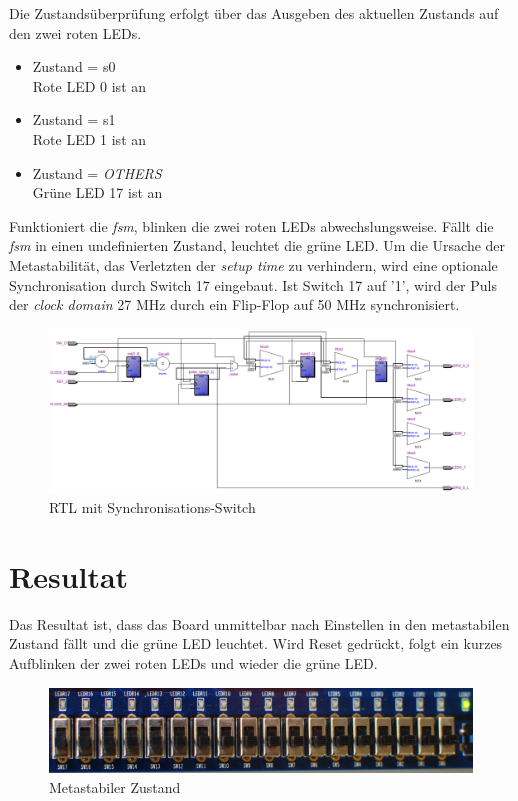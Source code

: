 Die Zustandsüberprüfung erfolgt über das Ausgeben des aktuellen Zustands auf den zwei roten LEDs. 

\begin{itemize}
	\item Zustand = s0\\
	Rote LED 0 ist an
	\item Zustand = s1\\
	 Rote LED 1 ist an
	\item Zustand = \textit{OTHERS}\\
	 Grüne LED 17 ist an
\end{itemize}

Funktioniert die \textit{fsm}, blinken die zwei roten LEDs abwechslungsweise. Fällt die \textit{fsm} in einen undefinierten Zustand, leuchtet die grüne LED. Um die Ursache der Metastabilität, das Verletzten der \textit{setup time} zu verhindern, wird eine optionale Synchronisation durch Switch 17 eingebaut. Ist Switch 17  auf '1', wird der Puls der \textit{clock domain} 27 MHz durch ein Flip-Flop auf 50 MHz synchronisiert.

\begin{figure}[H]
	\includegraphics[width=1\textwidth]{images/metastability/RtL_metastaibility.png}
	\caption{RTL mit Synchronisations-Switch}
	\label{fig.metastabil.RtL}
\end{figure}

\newpage
\section{Resultat}\label{sect.meatastabil_proozieren}

Das Resultat ist, dass das Board unmittelbar nach Einstellen in den metastabilen Zustand fällt und die grüne LED leuchtet. Wird Reset gedrückt, folgt ein kurzes Aufblinken der zwei roten LEDs und wieder die grüne LED.

\begin{figure}[H]
	\includegraphics[width=1\textwidth]{images/metastability/metastabil.JPG}
	\caption{Metastabiler Zustand}
	\label{fig.metastabil.Ergebnis_Boardasynchron}
\end{figure}

